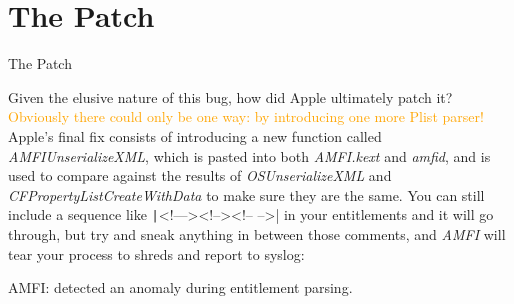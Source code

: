 \documentclass{beamer}
\begin{document}
\section{The Patch}
\begin{frame}[fragile]{The Patch}
\begin{flushleft}
Given the elusive nature of this bug, how did Apple ultimately patch it?
\vfill
\small \textcolor{orange}{Obviously there could only be one way: by introducing one more Plist parser!}
\vfill
\small{Apple’s final fix consists of introducing a new function called \emph{AMFIUnserializeXML}, which is pasted into both \emph{AMFI.kext} and \emph{amfid}, and is used to compare against the results of \emph{OSUnserializeXML} and \emph{CFPropertyListCreateWithData} to make sure they are the same.
\vfill 
You can still include a sequence like \texttt|<!---><!--><!-- -->| in your entitlements and it will go through, but try and sneak anything in between those comments, and \emph{AMFI} will tear your process to shreds and report to syslog:}
\begin{alertblock}{AMFI:}
detected an anomaly during entitlement parsing.
\end{alertblock}
\end{flushleft}
\end{frame}
\end{document}
